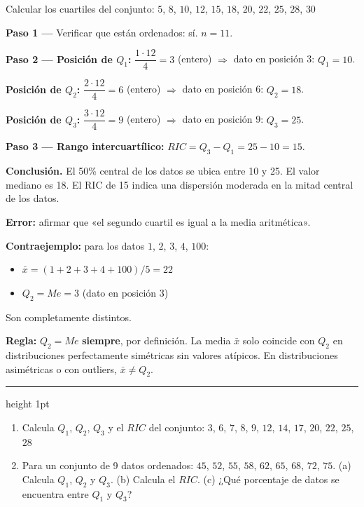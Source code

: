 \documentclass[11pt, letterpaper]{article}
\newcommand{\subbloque}[1]{%
  \vspace{14pt}
  \noindent{\large\bfseries\color{zenitnavy} #1}\par
  \vspace{4pt}\hrule height 1pt\vspace{8pt}}
\begin{document}
\begin{tcolorbox}[examplebox, title={Ej. 9. Cálculo de cuartiles}]
Calcular los cuartiles del conjunto: $5$, $8$, $10$, $12$, $15$, $18$, $20$, $22$, $25$, $28$, $30$

\textbf{Paso 1 ---} Verificar que están ordenados: sí. $n = 11$.
\medskip

\textbf{Paso 2 --- Posición de $Q_1$:} $\dfrac{1 \cdot 12}{4} = 3$ (entero) $\Rightarrow$ dato en posición 3: $Q_1 = 10$.

  \textbf{Posición de $Q_2$:} $\dfrac{2 \cdot 12}{4} = 6$ (entero) $\Rightarrow$ dato en posición 6: $Q_2 = 18$.

  \textbf{Posición de $Q_3$:} $\dfrac{3 \cdot 12}{4} = 9$ (entero) $\Rightarrow$ dato en posición 9: $Q_3 = 25$.
\medskip

\textbf{Paso 3 --- Rango intercuartílico:} $RIC = Q_3 - Q_1 = 25 - 10 = 15$.
\medskip

\noindent\textbf{Conclusión.} El 50\% central de los datos se ubica entre 10 y 25. El valor mediano es 18. El RIC de 15 indica una dispersión moderada en la mitad central de los datos.

\end{tcolorbox}

\begin{tcolorbox}[warningbox, title={Error frecuente: confundir $Q_2$ con la media aritmética}]
\textbf{Error:} afirmar que «el segundo cuartil es igual a la media aritmética».

\medskip

\textbf{Contraejemplo:} para los datos $1$, $2$, $3$, $4$, $100$:
\begin{itemize}
  \item $\bar{x} = (1+2+3+4+100)/5 = 22$
  \item $Q_2 = Me = 3$ (dato en posición 3)
\end{itemize}
Son completamente distintos.

\medskip

\textbf{Regla:} $Q_2 = Me$ \textbf{siempre}, por definición. La media $\bar{x}$ solo coincide con $Q_2$ en distribuciones perfectamente simétricas sin valores atípicos. En distribuciones asimétricas o con outliers, $\bar{x} \neq Q_2$.
\end{tcolorbox}

\subbloque{Práctica inmediata 5.1}

\begin{enumerate}[label=\textbf{\arabic*.}, leftmargin=*]
  \item Calcula $Q_1$, $Q_2$, $Q_3$ y el $RIC$ del conjunto:
  $3$, $6$, $7$, $8$, $9$, $12$, $14$, $17$, $20$, $22$, $25$, $28$

  \item Para un conjunto de 9 datos ordenados: $45$, $52$, $55$, $58$, $62$, $65$, $68$, $72$, $75$.
  (a) Calcula $Q_1$, $Q_2$ y $Q_3$.
  (b) Calcula el $RIC$.
  (c) ¿Qué porcentaje de datos se encuentra entre $Q_1$ y $Q_3$?

\vspace{3.2cm}
\end{enumerate}
\end{document}
